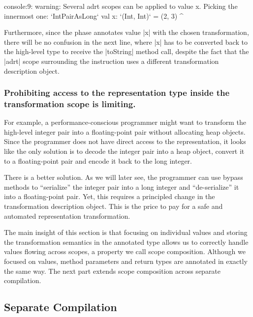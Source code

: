 \begin{lstlisting-nobreak}
console:9:  warning: Several adrt scopes can be applied to value x. Picking the innermost one: `IntPairAsLong`
val x: `(Int, Int)` = (2, 3)
          ^
\end{lstlisting-nobreak}

Furthermore, since the \inject{} phase annotates value |x| with the chosen transformation, there will be no confusion in the next line, where |x| has to be converted back to the high-level type to receive the |toString| method call, despite the fact that the |adrt| scope surrounding the instruction uses a different transformation description object.

\subsubsection{Prohibiting access to the representation type inside the transformation scope is limiting.} For example, a per\-for\-mance-conscious programmer might want to transform the high-level integer pair into a floating-point pair without allocating heap objects. Since the programmer does not have direct access to the representation, it looks like the only solution is to decode the integer pair into a heap object, convert it to a floating-point pair and encode it back to the long integer.

There is a better solution. As we will later see, the programmer can use bypass methods to ``serialize'' the integer pair into a long integer and ``de-serialize'' it into a floating-point pair. Yet, this requires a principled change in the transformation description object. This is the price to pay for a safe and automated representation transformation.

The main insight of this section is that focusing on individual values and storing the transformation semantics in the annotated type allows us to correctly handle values flowing across scopes, a property we call scope composition. Although we focused on values, method parameters and return types 
are annotated in exactly the same way. The next part extends scope composition across separate compilation.


\subsection{Separate Compilation}
\label{sec:ildl:separate-compilation}

